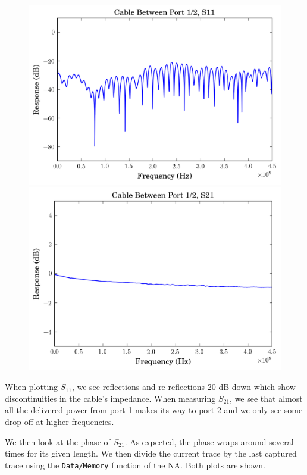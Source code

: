 \documentclass[11pt]{article}
\begin{document}
\begin{figure}[H]
	\includegraphics[width=\linewidth]{images/cable_phase_s11.png}
	\endminipage\hfill
	\includegraphics[width=\linewidth]{images/cable_phase_s21.png}
	\endminipage
\end{figure}

When plotting $S_{11}$, we see reflections and re-reflections 20 dB down which show discontinuities in the cable's impedance. When measuring $S_{21}$, we see that almost all the delivered power from port 1 makes its way to port 2 and we only see some drop-off at higher frequencies.


We then look at the phase of $S_{21}$. As expected, the phase wraps around several times for its given length. We then divide the current trace by the last captured trace using the \verb|Data/Memory| function of the NA. Both plots are shown.
\end{document}

